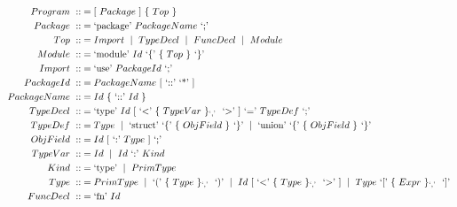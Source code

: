 \documentclass[letterpaper]{article}
\newcommand{\nonterminal}[1]{#1\ }
\newcommand{\terminal}[1]{\text{`#1'}\ }
\newcommand{\gramOption}[1]{[\ #1]\ }
\newcommand*{\gramRepeat}[2][]{\{\ #2\}_{#1}\ }
\newcommand{\gramOr}{\mid\ }
\begin{document}
\begin{align*}
%  
  \nonterminal{Program} ::&=
    \gramOption{\nonterminal{Package}} \gramRepeat{\nonterminal{Top}} \\
%
  \nonterminal{Package} ::&=
    \terminal{package} \nonterminal{PackageName} \terminal{;} \\
%
  \nonterminal{Top} ::&= \nonterminal{Import}
    \gramOr \nonterminal{TypeDecl}
    \gramOr \nonterminal{FuncDecl}
    \gramOr \nonterminal{Module} \\
%
  \nonterminal{Module} ::&=
    \terminal{module} \nonterminal {Id}
      \terminal{\{} \gramRepeat{\nonterminal{Top}} \terminal{\}} \\
%
  \nonterminal{Import} ::&=
    \terminal{use} \nonterminal{PackageId} \terminal{;} \\
%
  \nonterminal{PackageId} ::&=
    \nonterminal{PackageName} \gramOption{\terminal{::} \terminal{*}} \\
%
  \nonterminal{PackageName} ::&=
    \nonterminal{Id} \gramRepeat{\terminal{::} \nonterminal{Id}} \\
%
  \nonterminal{TypeDecl} ::&=
    \terminal{type} \nonterminal{Id}
      \gramOption{\terminal{\textless}
        \gramRepeat[\terminal{,}]{\nonterminal{TypeVar}} \terminal{\textgreater}}
      \terminal{=} \nonterminal{TypeDef} \terminal{;} \\
%
  \nonterminal{TypeDef} ::&= \nonterminal{Type}
    \gramOr \terminal{struct}
      \terminal{\{} \gramRepeat{\nonterminal{ObjField}} \terminal{\}}
    \gramOr \terminal{union}
      \terminal{\{} \gramRepeat{\nonterminal{ObjField}} \terminal{\}} \\
%
  \nonterminal{ObjField} ::&=
    \nonterminal{Id} \gramOption{\terminal{:} \nonterminal{Type}} \terminal{;} \\
%
  \nonterminal{TypeVar} ::&= \nonterminal{Id}
    \gramOr \nonterminal{Id} \terminal{:} \nonterminal{Kind} \\
%
  \nonterminal{Kind} ::&= \terminal{type} \gramOr \nonterminal{PrimType} \\
%
  \nonterminal{Type} ::&= \nonterminal{PrimType}
    \gramOr \terminal{(} \gramRepeat[\terminal{,}]{\nonterminal{Type}} \terminal{)}
    \gramOr \nonterminal{Id}
      \gramOption{\terminal{\textless}
        \gramRepeat[\terminal{,}]{\nonterminal{Type}} \terminal{\textgreater}}
    \gramOr \nonterminal{Type}
      \terminal{[} \gramRepeat[\terminal{,}]{\nonterminal{Expr}} \terminal{]} \\
%
  \nonterminal{FuncDecl} ::&=
    \terminal{fn} \nonterminal{Id}

\end{align*}
\end{document}
